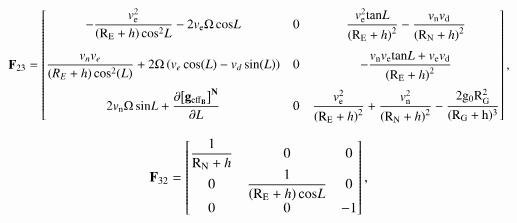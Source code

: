 \documentclass[3p]{elsarticle}
\begin{document}
	\begin{equation}\label{F23}
		{{\mathbf{F}}_{23}} =  \begin{bmatrix}
			{ - \dfrac{{{{ v}}_{\rm{e}}^2}}{{\left( {{{\rm{R}}_{\rm{E}}} +  h} \right){\rm{co}}{{\rm{s}}^2} L}} - 2{{ v}_{\rm{e}}}{\rm{\Omega \cos}} L} & 0 & {\dfrac{{{v}_{\rm{e}}^2{{\tan}} L}}{{{{\left( {{{\rm{R}}_{\rm{E}}} +  h} \right)}^2}}} - \dfrac{{{{ v}_{\rm{n}}}{{ v}_{\rm{d}}}}}{{{{\left( {{{\rm{R}}_{\rm{N}}} +  h} \right)}^2}}}} \\[1.4em]
			\dfrac{v_{n} v_{e}}{\left( R_{E} + h \right) \cos^2(L)} + 2\Omega \left(
				v_{e} \cos(L) - v_{d} \sin(L)
			\right)
			& 0 & -{\dfrac{{{{ v}_{\rm{n}}}{{ v}_{\rm{e}}}{{\tan}} L + {{ v}_{\rm{e}}}{{ v}_{\rm{d}}}}}{{{{\left( {{{\rm{R}}_{\rm{E}}} +  h} \right)}^2}}}} \\[1.2em]
			{2{{ v}_{\rm{n}}}{\rm{\Omega \sin}} L} + \dfrac{\partial {\left[\mathbf{g}_{\mathrm{eff}_{\mathbf{B}}}\right]}^{\mathbf{N}}}{\partial L} & 0 & {\dfrac{{{{ v}}_{\rm{e}}^2}}{{{{\left( {{{\rm{R}}_{\rm{E}}} +  h} \right)}^2}}} + \dfrac{{{{ v}}_{\rm{n}}^2}}{{{{\left( {{{\rm{R}}_{\rm{N}}} +  h} \right)}^2}}} - \dfrac{{2{{\rm{g_0R_G^2}}}}}{{(\rm{R_G}+h)^3}}}
		\end{bmatrix},
	\end{equation}
%

\begin{equation}\label{F32}
	{{\mathbf{F}}_{32}} = \begin{bmatrix}
		\dfrac{1}{{{{\rm{R}}_{\rm{N}}} +  h}} & 0 & 0 \\
		0 & \dfrac{1}{{\left( {{{\rm{R}}_{\rm{E}}} +  h} \right){\cos} L}} & 0 \\
		0 & 0 & -1
	\end{bmatrix},
\end{equation}
\end{document}

